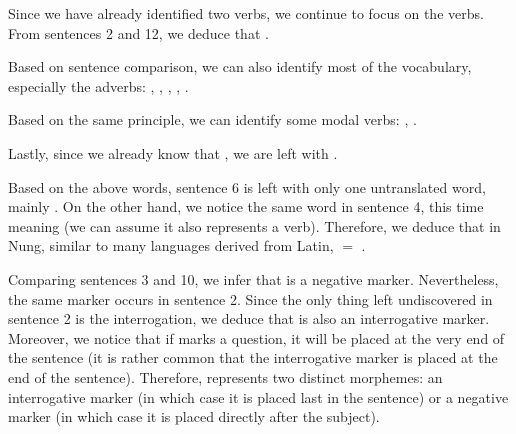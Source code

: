 \begin{refsection}
\begin{mysolution}
\begin{description}[labelwidth=\widthof{\bfseries Step 3.},leftmargin=!]
Since we have already identified two verbs, we continue to focus on the verbs. From sentences 2 and 12, we deduce that .

\item[Step 3.] Based on sentence comparison, we can also identify most of the vocabulary, especially the adverbs: , , , , .

Based on the same principle, we can identify some modal verbs: , .

Lastly, since we already know that , we are left with .

\item[Step 4.] Based on the above words, sentence 6 is left with only one untranslated word, mainly . On the other hand, we notice the same word in sentence 4, this time meaning  (we can assume it also represents a verb). Therefore, we deduce that in Nung, similar to many languages derived from Latin,  $=$ .

Comparing sentences 3 and 10, we infer that  is a negative marker. Nevertheless, the same marker occurs in sentence 2. Since the only thing left undiscovered in sentence 2 is the interrogation, we deduce that  is also an interrogative marker. Moreover, we notice that if  marks a question, it will be placed at the very end of the sentence (it is rather common that the interrogative marker is placed at the end of the sentence). Therefore,  represents two distinct morphemes: an interrogative marker (in which case it is placed last in the sentence) or a negative marker (in which case it is placed directly after the subject).


\end{description}
\end{mysolution}
\end{refsection}
